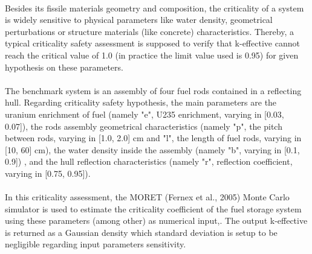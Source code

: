 \documentclass[11pt]{scrartcl}
\begin{document}
\paragraph{}
Besides its fissile materials geometry and composition, the criticality of a system is widely sensitive to physical parameters like water density, geometrical perturbations or structure materials (like concrete) characteristics. Thereby, a typical criticality safety assessment is supposed to verify that k-effective cannot reach the critical value of 1.0 (in practice the limit value used is 0.95) for given hypothesis on these parameters. 

\paragraph{}
The benchmark system is an assembly of four fuel rods contained in a reflecting hull. Regarding criticality safety hypothesis, the main parameters are the uranium enrichment of fuel (namely "e", U235 enrichment, varying in [0.03, 0.07]), the rods assembly geometrical characteristics (namely "p", the pitch between rods, varying in [1.0, 2.0] cm and "l", the length of fuel rods, varying in [10, 60] cm), the water density inside the assembly (namely "b", varying in [0.1, 0.9]) , and the hull reflection characteristics (namely "r", reflection coefficient, varying in [0.75, 0.95]). 

\paragraph{}
In this criticality assessment, the MORET (Fernex et al., 2005) Monte Carlo simulator is used to estimate the criticality coefficient of the fuel storage system using these parameters (among other) as numerical input,. The output k-effective is returned as a Gaussian density which standard deviation is setup to be negligible regarding input parameters sensitivity. 
\end{document}
